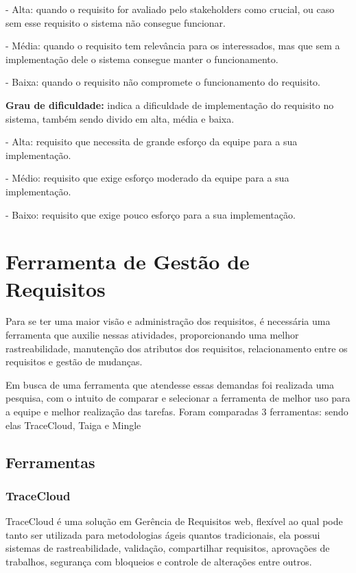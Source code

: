 - Alta: quando o requisito for avaliado pelo stakeholders como crucial, ou caso sem esse requisito o sistema não consegue funcionar.

- Média: quando o requisito tem relevância para os interessados, mas que sem a implementação dele o sistema consegue manter o funcionamento.

- Baixa: quando o requisito não compromete o funcionamento do requisito.

\textbf{Grau de dificuldade:} indica a dificuldade de implementação do requisito no sistema, também sendo divido em alta, média e baixa.

- Alta: requisito que necessita de grande esforço da equipe para a sua implementação.

- Médio: requisito que exige esforço moderado da equipe para a sua implementação.

- Baixo: requisito que exige pouco esforço para a sua implementação.

\chapter{Ferramenta de Gestão de Requisitos}
Para se ter uma maior visão e administração dos requisitos, é necessária uma  ferramenta que auxilie nessas atividades,
proporcionando uma melhor rastreabilidade, manutenção dos atributos dos requisitos, relacionamento entre os requisitos e
gestão de mudanças.

Em busca de uma ferramenta que atendesse essas demandas foi realizada uma pesquisa, com o intuito de comparar e selecionar a
 ferramenta de melhor uso para a equipe e melhor realização das tarefas. Foram comparadas 3 ferramentas: sendo elas TraceCloud,
  Taiga e Mingle

\section{Ferramentas}
	\subsection{TraceCloud}
	TraceCloud é uma solução em Gerência de Requisitos web, flexível ao qual pode tanto ser utilizada para metodologias ágeis
	quantos tradicionais, ela possui sistemas de rastreabilidade, validação, compartilhar requisitos, aprovações de trabalhos,
	 segurança com bloqueios e controle de alterações entre outros.


